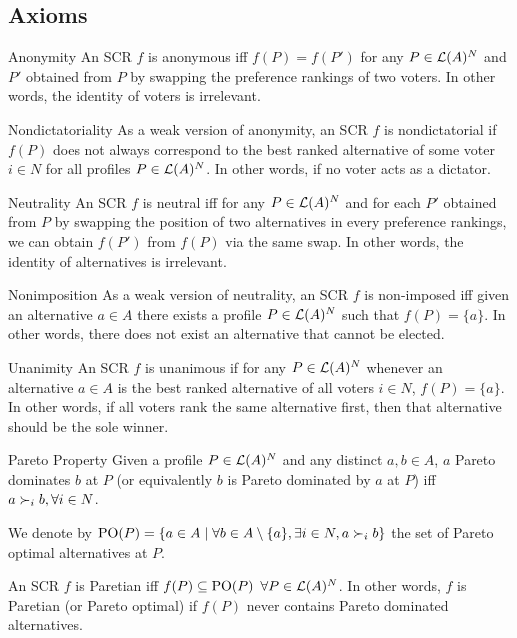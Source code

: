 \subsection{Axioms}

	\begin{genthm}{Anonymity}
	An \acs{SCR} $f$ is anonymous iff $f(P)=f(P')$ for any $P\in\mathcal{L}(A)^{N}$ and $P'$ obtained from $P$ by swapping the preference rankings of two voters. In other words, the identity of voters is irrelevant.
	\end{genthm}

	\begin{genthm}{Nondictatoriality}
	As a weak version of anonymity, an \acs{SCR} $f$ is nondictatorial if $f(P)$ does not always correspond to the best ranked alternative of some voter $i \in N$ for all profiles $P\in\mathcal{L}(A)^{N}$. In other words, if no voter acts as a dictator.
	\end{genthm}

	\begin{genthm}{Neutrality}
	An \acs{SCR} $f$ is neutral iff for any $P\in\mathcal{L}(A)^{N}$ and for each $P'$ obtained from $P$ by swapping the position of two alternatives in every preference rankings, we can obtain $f(P')$ from $f(P)$ via the same swap. In other words, the identity of alternatives is irrelevant.	
	\end{genthm}

	\begin{genthm}{Nonimposition}
	As a weak version of neutrality, an \acs{SCR} $f$ is non-imposed iff given an alternative $a \in A$ there exists a profile $P\in\mathcal{L}(A)^{N}$ such that $f(P)=\{a\}$. In other words, there does not exist an alternative that cannot be elected.	
	\end{genthm}

	\begin{genthm}{Unanimity}
	An \acs{SCR} $f$ is unanimous if for any $P\in\mathcal{L}(A)^{N}$ whenever an alternative $a \in A$ is the best ranked alternative of all voters $i \in N$, $f(P)=\{a\}$. In other words, if all voters rank the same alternative first, then that alternative should be the sole winner.	
	\end{genthm}

	\begin{genthm}{Pareto Property}
	Given a profile $P\in\mathcal{L}(A)^{N}$ and any distinct $a,b\in A$, $a$ Pareto dominates $b$ at $P$ (or equivalently $b$ is Pareto dominated by $a$ at $P$) iff $a \prefi b,\forall i\in N$.
	
	We denote by $\paretopt(P)= \set{a \in A \suchthat \forall b \in A\setminus\{a\}, \exists i \in N, a \pref_i b}$ the set of Pareto optimal alternatives at $P$.
	
	An \acs{SCR} $f$ is Paretian iff $f(P)\subseteq\text{PO}(P)$ $\forall P\in\mathcal{L}(A)^{N}$. In other words, $f$ is Paretian (or Pareto optimal) if $f(P)$ never contains Pareto dominated alternatives.	
	\end{genthm}

